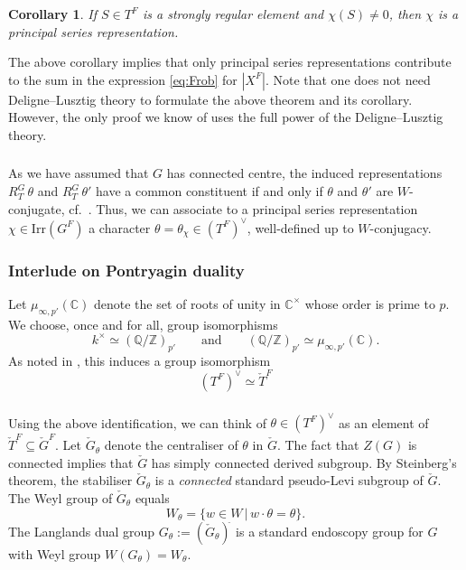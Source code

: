 \documentclass[12pt]{amsart}
\theoremstyle{plain}
\newtheorem{cor}[thm]{Corollary}
\theoremstyle{definition}
\theoremstyle{remark}
\newcommand{\bC}{\mathbb{C}}
\newcommand{\bCt}{\mathbb{C}^\times}
\newcommand{\Irr}{\mathrm{Irr}}
\newcommand{\chG}{\check{G}}
\newcommand{\chT}{\check{T}}
\begin{document}
\begin{cor} \label{c:regular} 
If $S\in T^F$ is a strongly regular element and $\chi(S)\neq 0$, then $\chi$ is a principal series representation.  
\end{cor} 

 
The above corollary implies that only principal series representations contribute to the sum in the expression \eqref{eq:Frob} for $|X^F|$.
Note that one does not need Deligne--Lusztig theory to formulate the above theorem and its corollary. However, the only proof we know of uses the full power of the Deligne--Lusztig theory. 
 

\subsubsection{}  As we have assumed that $G$ has connected centre, the induced representations $R_T^G\, \theta$ and $R_T^G\, \theta'$ have a common constituent if and only if $\theta$ and $\theta'$ are $W$-conjugate, cf.\ \cite[Corollary 6.3]{DL76}.  
Thus, we can associate to a principal series representation $\chi\in \Irr(G^F)$ a character $\theta=\theta_\chi \in (T^F)^\vee$, well-defined up to $W$-conjugacy. 


\subsubsection{Interlude on Pontryagin duality} \label{s:Pontryagin}
Let $\mu_{\infty,p'}(\bC)$ denote the set of  roots of unity in $\bCt$ whose order is prime to $p$. We choose, once and for all, group isomorphisms
\begin{equation}\label{eq:rootsOfUnity}
k^\times \simeq (\mathbb{Q}/\mathbb{Z})_{p'} \qquad \textrm{and} \qquad (\mathbb{Q}/\mathbb{Z})_{p'}\simeq \mu_{\infty,p'}(\bC). 
\end{equation} 
 As noted in \cite[\S 5]{DL76}, this induces a group isomorphism 
 \begin{equation}
(T^F)^\vee\simeq \chT^F
\end{equation} 


\subsubsection{} Using the above identification, we can think of $\theta\in (T^F)^\vee$ as an element of $\check{T}^F\subseteq \check{G}^F$. 
Let $\check{G}_\theta$ denote the centraliser of $\theta$ in $\check{G}$. The fact that $Z(G)$ is connected implies that $\chG$ has simply connected derived subgroup. By Steinberg's theorem, the stabiliser  $\chG_\theta$ is a \emph{connected} standard pseudo-Levi subgroup of $\chG$.  The Weyl group of $\chG_\theta$ equals 
\[
W_\theta=\{w\in W\, |\, w\cdot \theta=\theta\}.
\] 
The Langlands dual group $G_\theta:=(\check{G}_\theta)^{\check{}}$ is a standard endoscopy group for $G$ with Weyl group  $W(G_\theta)=W_\theta$. 
\end{document}
